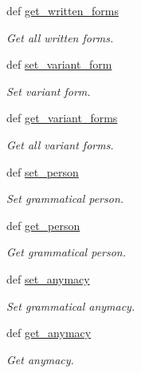 \begin{DoxyCompactItemize}
def \hyperlink{classlmf_1_1src_1_1morphology_1_1word__form_1_1_word_form_a2b3298d15f912796519e19465610fad0}{get\+\_\+written\+\_\+forms}
\begin{DoxyCompactList}\small\item\em Get all written forms. \end{DoxyCompactList}\item 
def \hyperlink{classlmf_1_1src_1_1morphology_1_1word__form_1_1_word_form_aa4010d675af6deb25bf95e7aa54c3f15}{set\+\_\+variant\+\_\+form}
\begin{DoxyCompactList}\small\item\em Set variant form. \end{DoxyCompactList}\item 
def \hyperlink{classlmf_1_1src_1_1morphology_1_1word__form_1_1_word_form_a983151c5529388c7a3002b3239a98b98}{get\+\_\+variant\+\_\+forms}
\begin{DoxyCompactList}\small\item\em Get all variant forms. \end{DoxyCompactList}\item 
def \hyperlink{classlmf_1_1src_1_1morphology_1_1word__form_1_1_word_form_aae046a3403c0fe9ae8f35289878cba67}{set\+\_\+person}
\begin{DoxyCompactList}\small\item\em Set grammatical person. \end{DoxyCompactList}\item 
def \hyperlink{classlmf_1_1src_1_1morphology_1_1word__form_1_1_word_form_a480a6988b8ca2febc53b5d738ae12fac}{get\+\_\+person}
\begin{DoxyCompactList}\small\item\em Get grammatical person. \end{DoxyCompactList}\item 
def \hyperlink{classlmf_1_1src_1_1morphology_1_1word__form_1_1_word_form_a77770e33a70efbf55aa2279c2dbb1112}{set\+\_\+anymacy}
\begin{DoxyCompactList}\small\item\em Set grammatical anymacy. \end{DoxyCompactList}\item 
def \hyperlink{classlmf_1_1src_1_1morphology_1_1word__form_1_1_word_form_a15a5458e866a9bc063766393f1724618}{get\+\_\+anymacy}
\begin{DoxyCompactList}\small\item\em Get anymacy. \end{DoxyCompactList}\item 

\end{DoxyCompactItemize}
